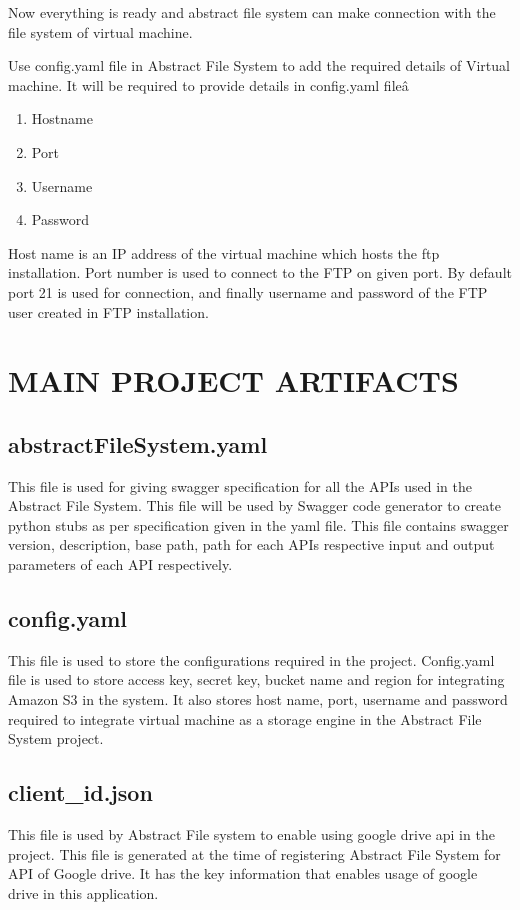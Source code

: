 Now everything is ready and abstract file system can make connection with the 
file system of virtual machine.


Use config.yaml file in Abstract File System to add the required details of 
Virtual machine. 
It will be required to provide details in config.yaml fileâ 
\begin{enumerate}
    \item Hostname
    \item Port
    \item Username
    \item Password
\end{enumerate}


Host name is an IP address of the virtual machine which hosts the ftp 
installation. Port number is used to connect to the FTP on given port. By 
default port 21 is used for connection, and finally username and password of 
the FTP user created in FTP installation.





\section{MAIN PROJECT ARTIFACTS}
\subsection{abstractFileSystem.yaml}
This file is used for giving swagger specification for all the APIs used in 
the Abstract File System. This file will be used by Swagger code generator to 
create python stubs as per specification given in the yaml file.
This file contains swagger version, description, base path, path for each APIs 
respective input and output parameters of each API respectively.

\subsection{config.yaml}
This file is used to store the configurations required in the project. 
Config.yaml file is used to store access key, secret key, bucket name and 
region for integrating Amazon S3 in the system. It also stores host name, 
port, username and password required to integrate virtual machine as a storage 
engine in the Abstract File System project.

\subsection{client_id.json}
This file is used by Abstract File system to enable using google drive api in 
the project. This file is generated at the time of registering Abstract File 
System for API of Google drive. It has the key information that enables usage 
of google drive in this application. 

